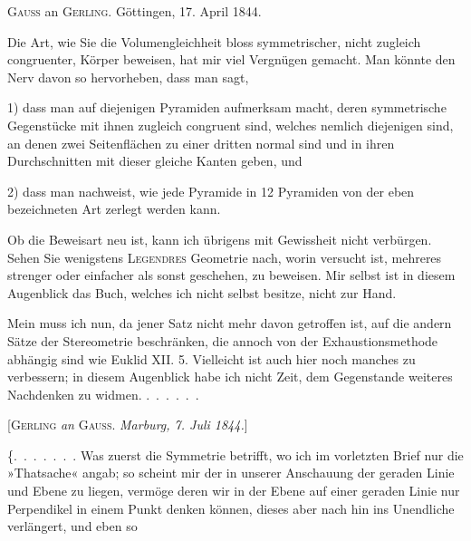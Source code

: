 %
\begin{center}
\textsc{Gauss} an \textsc{Gerling.} Göttingen, 17. April 1844.
\end{center}

Die Art, wie Sie die Volumengleichheit bloss symmetrischer, nicht zugleich
congruenter, Körper beweisen, hat mir viel Vergnügen gemacht. Man könnte
den Nerv davon so hervorheben, dass man sagt,

1) dass man auf diejenigen Pyramiden aufmerksam macht, deren symmetrische
Gegenstücke mit ihnen zugleich congruent sind, welches nemlich diejenigen
sind, an denen zwei Seitenflächen zu einer dritten normal sind und in ihren
Durchschnitten mit dieser gleiche Kanten geben, und

2) dass man nachweist, wie jede Pyramide in 12 Pyramiden von der eben
bezeichneten Art zerlegt werden kann.

Ob die Beweisart neu ist, kann ich übrigens mit Gewissheit nicht verbürgen.
Sehen Sie wenigstens \textsc{Legendres} Geometrie nach, worin versucht ist,
mehreres strenger oder einfacher als sonst geschehen, zu beweisen. Mir
selbst ist in diesem Augenblick das Buch, welches ich nicht selbst besitze,
nicht zur Hand.

Mein  muss ich nun, da jener Satz nicht mehr davon getroffen ist,
auf die andern Sätze der Stereometrie beschränken, die annoch von der
Exhaustionsmethode abhängig sind wie Euklid XII. 5. Vielleicht ist auch
hier noch manches zu verbessern; in diesem Augenblick habe ich nicht Zeit,
dem Gegenstande weiteres Nachdenken zu widmen. \mbox{.\ .\ .\ .\ .\ .}

\begin{center}
[\textsc{Gerling} \emph{an} \textsc{Gauss}. \emph{Marburg, 7. Juli 1844.}]
\end{center}

\{\mbox{.\ .\ .\ .\ .\ .\ .} Was zuerst die Symmetrie betrifft, wo ich im vorletzten Brief
nur die »Thatsache« angab; so scheint mir der  in unserer Anschauung
der geraden Linie und Ebene zu liegen, vermöge deren wir in der Ebene auf
einer geraden Linie nur  Perpendikel in einem Punkt denken können,
dieses aber nach  hin ins Unendliche verlängert, und eben so
